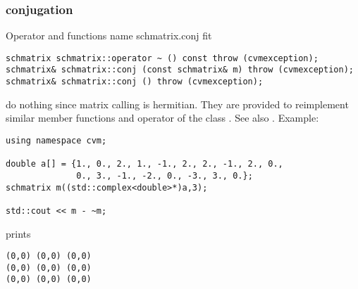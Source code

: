 \subsubsection{conjugation}
Operator and functions%
\pdfdest name {schmatrix.conj} fit
\begin{verbatim}
schmatrix schmatrix::operator ~ () const throw (cvmexception);
schmatrix& schmatrix::conj (const schmatrix& m) throw (cvmexception);
schmatrix& schmatrix::conj () throw (cvmexception);
\end{verbatim}
do nothing since  matrix calling is hermitian.
They are provided to reimplement similar member functions and operator
of the class .
See also .
Example:
\begin{Verbatim}
using namespace cvm;

double a[] = {1., 0., 2., 1., -1., 2., 2., -1., 2., 0.,
              0., 3., -1., -2., 0., -3., 3., 0.};
schmatrix m((std::complex<double>*)a,3);

std::cout << m - ~m;
\end{Verbatim}
prints
\begin{Verbatim}
(0,0) (0,0) (0,0)
(0,0) (0,0) (0,0)
(0,0) (0,0) (0,0)
\end{Verbatim}
\newpage




